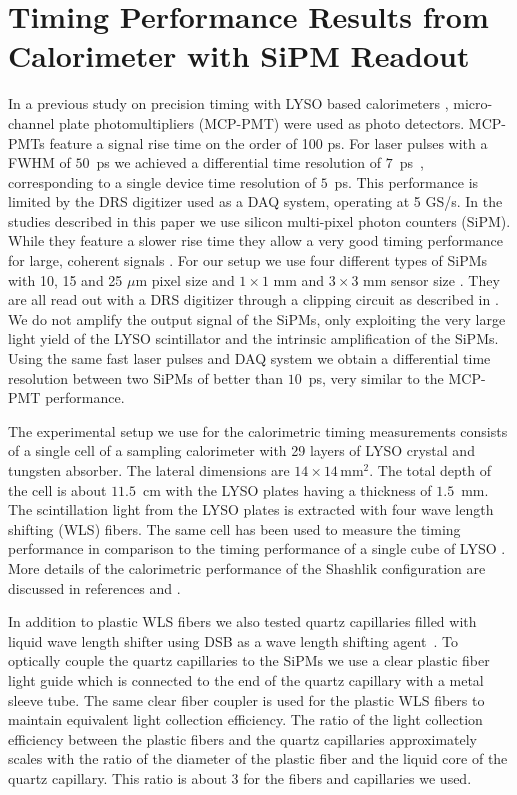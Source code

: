\section{Timing Performance Results from Calorimeter with SiPM Readout}
\label{sec:beamtiming}

In a previous study on precision timing with LYSO based calorimeters \cite{lysotiming}, micro-channel plate photomultipliers 
(MCP-PMT) were used as photo detectors. MCP-PMTs feature a signal rise time on the order of 100 ps. For laser pulses with a FWHM of 
$50$~ps we achieved a differential time resolution of $7$~ps~\cite{elba2015}, corresponding to a single device time resolution of 
$5$~ps. This performance is limited by the DRS digitizer used as a DAQ system, operating at 5 GS/s. In the studies described in this 
paper we use silicon multi-pixel photon counters (SiPM). While they feature a slower rise time they allow a very good timing 
performance for large, coherent signals \cite{aashrita}. For our setup we use four different types of SiPMs with 10, 15 and 
25 $\mu$m pixel size and $1 \times 1$ mm and $3 \times 3$ mm sensor size \cite{hama}. They are all read out with a DRS digitizer 
through a clipping circuit as described in \cite{aashrita}. We do not amplify the output signal of the SiPMs, only exploiting 
the very large light yield of the LYSO scintillator and the intrinsic amplification of the SiPMs.
Using the same fast laser pulses and DAQ system we obtain a differential time resolution between two SiPMs of better than $10$~ps, 
very similar to the MCP-PMT performance.

The experimental setup we use for the calorimetric timing measurements consists of a single cell of a sampling calorimeter with 29 
layers of LYSO crystal and tungsten absorber. The lateral dimensions are $\mathrm{14 \times 14 \,mm^2}$. The total depth of the 
cell is about $11.5$~cm with the LYSO plates having a thickness of $1.5$~mm. The scintillation light from the LYSO plates is 
extracted with four wave length shifting (WLS) fibers. The same cell has been used to measure the timing performance in 
comparison to the timing performance of a single cube of LYSO \cite{lysotiming}. More details of the calorimetric performance 
of the Shashlik configuration are discussed in references \cite{shashlik1} and \cite{shashlik2}.

In addition to plastic WLS fibers we also tested quartz capillaries filled with liquid wave length shifter using DSB as a wave length 
shifting agent~\cite{capillaries}. To optically couple the quartz capillaries to the SiPMs we use a clear plastic fiber light guide 
which is connected to the end of the quartz capillary with a metal sleeve tube. The same clear fiber coupler is used for the 
plastic WLS fibers to maintain equivalent light collection efficiency. The ratio of the light collection efficiency between the 
plastic fibers and the quartz capillaries approximately scales with the ratio of the diameter of the plastic fiber and the 
liquid core of the quartz capillary. This ratio is about $3$ for the fibers and capillaries we used.

